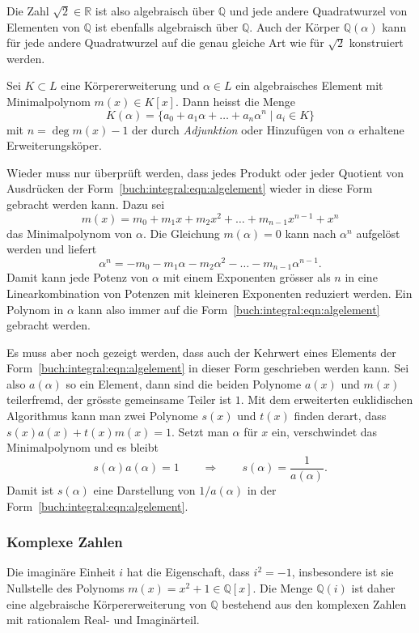 Die Zahl $\sqrt{2}\in\mathbb{R}$ ist also algebraisch über $\mathbb{Q}$
und jede andere Quadratwurzel von Elementen von $\mathbb{Q}$ ist
ebenfalls algebraisch über $\mathbb{Q}$.
Auch der Körper $\mathbb{Q}(\alpha)$ kann für jede andere Quadratwurzel
auf die genau gleiche Art wie für $\sqrt{2}$ konstruiert werden.

\begin{definition}
\label{buch:integral:definition:algebraischeerweiterung}
Sei $K\subset L$ eine Körpererweiterung und $\alpha\in L$ ein algebraisches
Element mit Minimalpolynom $m(x)\in K[x]$.
Dann heisst die Menge
\begin{equation}
K(\alpha)
=
\{
a_0 + a_1\alpha + \ldots +a_n\alpha^n
\;|\;
a_i\in K
\}
\label{buch:integral:eqn:algelement}
\end{equation}
mit $n=\deg m(x) - 1$ der durch {\em Adjunktion} oder Hinzufügen
von $\alpha$ erhaltene Erweiterungsköper.
\end{definition}

Wieder muss nur überprüft werden, dass jedes Produkt oder jeder
Quotient von Ausdrücken der Form~\eqref{buch:integral:eqn:algelement}
wieder in diese Form gebracht werden kann.
Dazu sei
\[
m(x)
=
m_0+m_1x + m_2x^2
+\ldots +m_{n-1}x^{n-1} + x^n
\]
das Minimalpolynom von $\alpha$.
Die Gleichung $m(\alpha)=0$ kann nach $\alpha^n$ aufgelöst werden und
liefert
\[
\alpha^n = -m_0 - m_1\alpha - m_2\alpha^2 -\ldots -m_{n-1}\alpha^{n-1}.
\]
Damit kann jede Potenz von $\alpha$ mit einem Exponenten grösser als $n$
in eine Linearkombination von Potenzen mit kleineren Exponenten
reduziert werden.
Ein Polynom in $\alpha$ kann also immer auf die
Form~\eqref{buch:integral:eqn:algelement}
gebracht werden.

Es muss aber noch gezeigt werden, dass auch der Kehrwert eines Elements
der Form~\eqref{buch:integral:eqn:algelement} in dieser Form geschrieben
werden kann.
Sei also $a(\alpha)$ so ein Element, dann sind die beiden Polynome
$a(x)$ und $m(x)$ teilerfremd, der grösste gemeinsame Teiler ist $1$.
Mit dem erweiterten euklidischen Algorithmus kann man zwei Polynome
$s(x)$ und $t(x)$ finden derart, dass $s(x)a(x)+t(x)m(x)=1$.
Setzt man $\alpha$ für $x$ ein, verschwindet das Minimalpolynom und
es bleibt
\[
s(\alpha)a(\alpha) = 1
\qquad\Rightarrow\qquad
s(\alpha) = \frac{1}{a(\alpha)}.
\]
Damit ist $s(\alpha)$ eine Darstellung von $1/a(\alpha)$ in der 
Form~\eqref{buch:integral:eqn:algelement}.

%
%
\subsubsection{Komplexe Zahlen}
Die imaginäre Einheit $i$ hat die Eigenschaft, dass $i^2=-1$, insbesondere
ist sie Nullstelle des Polynoms $m(x)=x^2+1\in\mathbb{Q}[x]$.
Die Menge $\mathbb{Q}(i)$ ist daher eine algebraische Körpererweiterung
von $\mathbb{Q}$ bestehend aus den komplexen Zahlen mit rationalem
Real- und Imaginärteil.

